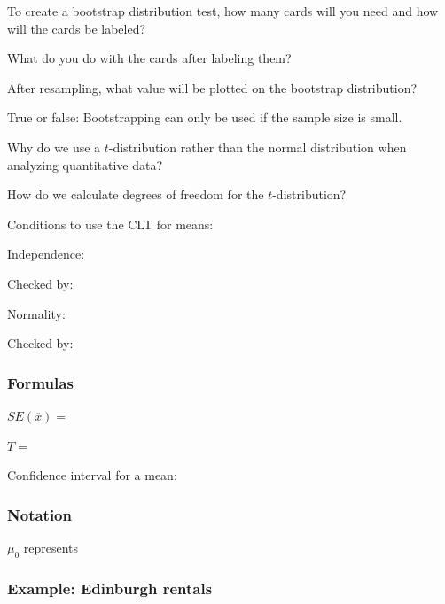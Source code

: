 \documentclass[
]{report}
\newcommand{\rgs}{\vspace{12pt}} %
\newcommand{\rgi}{\hspace{24pt}}  %
\begin{document}
To create a bootstrap distribution test, how many cards will you need and how will the cards be labeled?
\rgs 

What do you do with the cards after labeling them?
\rgs 

After resampling, what value will be plotted on the bootstrap distribution?
\rgs 

True or false: Bootstrapping can only be used if the sample size is small.
\rgs 

Why do we use a \(t\)-distribution rather than the normal distribution when analyzing quantitative data?
\rgs 

How do we calculate degrees of freedom for the \(t\)-distribution?
\rgs 

Conditions to use the CLT for means:

\rgi Independence:
\rgs 

\rgi \rgi Checked by:
\rgs 

\rgi Normality:
\rgs 

\rgi \rgi Checked by:
\rgs 

\hypertarget{formulas-5}{%
\subsubsection*{Formulas}\label{formulas-5}}

\(SE(\overline{x})=\)
\rgs 

\(T=\)
\rgs 

Confidence interval for a mean:
\rgs 

\hypertarget{notation-2}{%
\subsubsection*{Notation}\label{notation-2}}

\(\mu_0\) represents
\rgs 

\hypertarget{example-edinburgh-rentals}{%
\subsubsection*{Example: Edinburgh rentals}\label{example-edinburgh-rentals}}
\end{document}
